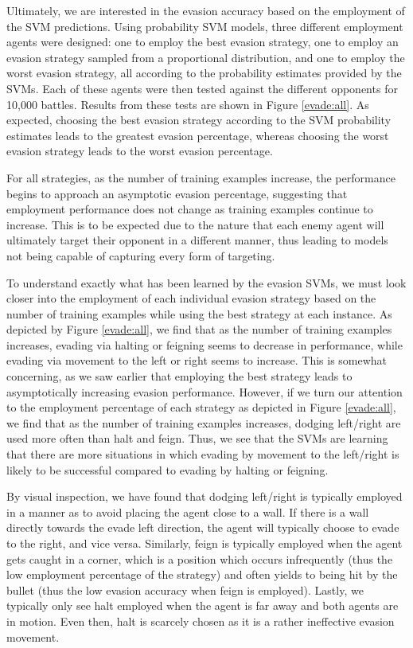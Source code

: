 \documentclass{article}
\theoremstyle{plain}
\theoremstyle{definition}
\theoremstyle{remark}
\begin{document}
Ultimately, we are interested in the evasion accuracy based on the employment of the SVM predictions. Using probability SVM models, three different employment agents were designed: one to employ the best evasion strategy, one to employ an evasion strategy sampled from a proportional distribution, and one to employ the worst evasion strategy, all according to the probability estimates provided by the SVMs. Each of these agents were then tested against the different opponents for 10,000 battles. Results from these tests are shown in Figure \ref{evade:all}. As expected, choosing the best evasion strategy according to the SVM probability estimates leads to the greatest evasion percentage, whereas choosing the worst evasion strategy leads to the worst evasion percentage.

For all strategies, as the number of training examples increase, the performance begins to approach an asymptotic evasion percentage, suggesting that employment performance does not change as training examples continue to increase. This is to be expected due to the nature that each enemy agent will ultimately target their opponent in a different manner, thus leading to models not being capable of capturing every form of targeting.

To understand exactly what has been learned by the evasion SVMs, we must look closer into the employment of each individual evasion strategy based on the number of training examples while using the best strategy at each instance. As depicted by Figure \ref{evade:all}, we find that as the number of training examples increases, evading via halting or feigning seems to decrease in performance, while evading via movement to the left or right seems to increase. This is somewhat concerning, as we saw earlier that employing the best strategy leads to asymptotically increasing evasion performance. However, if we turn our attention to the employment percentage of each strategy as depicted in Figure \ref{evade:all}, we find that as the number of training examples increases, dodging left/right are used more often than halt and feign. Thus, we see that the SVMs are learning that there are more situations in which evading by movement to the left/right is likely to be successful compared to evading by halting or feigning.

By visual inspection, we have found that dodging left/right is typically employed in a manner as to avoid placing the agent close to a wall. If there is a wall directly towards the evade left direction, the agent will typically choose to evade to the right, and vice versa. Similarly, feign is typically employed when the agent gets caught in a corner, which is a position which occurs infrequently (thus the low employment percentage of the strategy) and often yields to being hit by the bullet (thus the low evasion accuracy when feign is employed). Lastly, we typically only see halt employed when the agent is far away and both agents are in motion. Even then, halt is scarcely chosen as it is a rather ineffective evasion movement.
\end{document}
